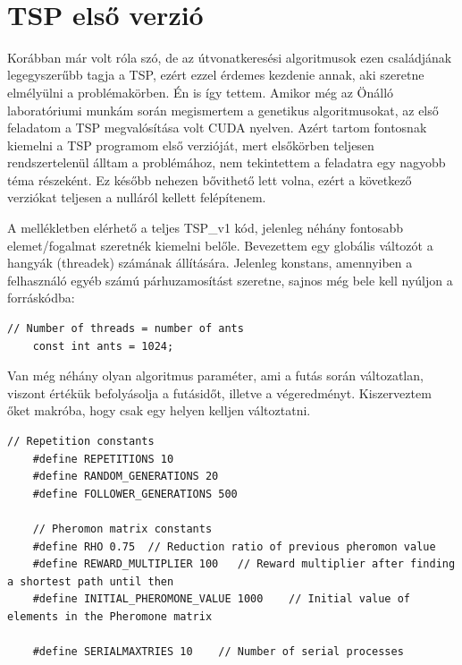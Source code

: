 \begin{lstlisting}[style=CStyle]
	
\end{lstlisting}


\section{TSP első verzió} \label{TSP_v1_SubSection}
Korábban már volt róla szó, de az útvonatkeresési algoritmusok ezen családjának legegyszerűbb tagja a TSP, ezért ezzel érdemes kezdenie annak, aki szeretne elmélyülni a problémakörben. Én is így tettem. Amikor még az Önálló laboratóriumi munkám során megismertem a genetikus algoritmusokat, az első feladatom a TSP megvalósítása volt CUDA nyelven. Azért tartom fontosnak kiemelni a TSP programom első verzióját, mert elsőkörben teljesen rendszertelenül álltam a problémához, nem tekintettem a feladatra egy nagyobb téma részeként. Ez később nehezen bővithető lett volna, ezért a következő verziókat teljesen a nulláról kellett felépítenem.

A mellékletben elérhető a teljes TSP\_v1 kód, jelenleg néhány fontosabb elemet/fogalmat szeretnék kiemelni belőle.
Bevezettem egy globális változót a hangyák (threadek) számának állítására. Jelenleg konstans, amennyiben a felhasználó egyéb számú párhuzamosítást szeretne, sajnos még bele kell nyúljon a forráskódba:

\begin{lstlisting}[style=CStyle]
	// Number of threads = number of ants
	const int ants = 1024;
\end{lstlisting}

Van még néhány olyan algoritmus paraméter, ami a futás során változatlan, viszont értékük befolyásolja a futásidőt, illetve a végeredményt. Kiszerveztem őket makróba, hogy csak egy helyen kelljen változtatni.

\begin{lstlisting}[style=CStyle]
	// Repetition constants
	#define REPETITIONS 10
	#define RANDOM_GENERATIONS 20
	#define FOLLOWER_GENERATIONS 500
	
	// Pheromon matrix constants
	#define RHO 0.75  // Reduction ratio of previous pheromon value
	#define REWARD_MULTIPLIER 100   // Reward multiplier after finding a shortest path until then
	#define INITIAL_PHEROMONE_VALUE 1000    // Initial value of elements in the Pheromone matrix
	
	#define SERIALMAXTRIES 10    // Number of serial processes
\end{lstlisting}

